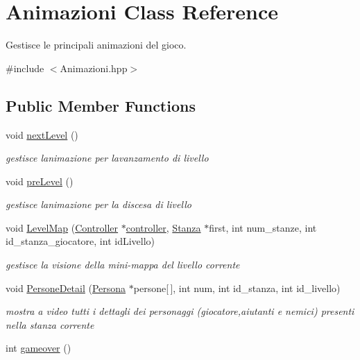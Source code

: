 \hypertarget{classAnimazioni}{}\section{Animazioni Class Reference}
\label{classAnimazioni}


Gestisce le principali animazioni del gioco.  




{\ttfamily \#include $<$Animazioni.\+hpp$>$}

\subsection*{Public Member Functions}
\begin{DoxyCompactItemize}
\item 
\hypertarget{classAnimazioni_a4b82cad764f55cf17fbf4c368909f102}{}void \hyperlink{classAnimazioni_a4b82cad764f55cf17fbf4c368909f102}{next\+Level} ()\label{classAnimazioni_a4b82cad764f55cf17fbf4c368909f102}

\begin{DoxyCompactList}\small\item\em gestisce l\textquotesingle{}animazione per l\textquotesingle{}avanzamento di livello \end{DoxyCompactList}\item 
\hypertarget{classAnimazioni_aaa3627d10d1a0179e47ad4483714f460}{}void \hyperlink{classAnimazioni_aaa3627d10d1a0179e47ad4483714f460}{pre\+Level} ()\label{classAnimazioni_aaa3627d10d1a0179e47ad4483714f460}

\begin{DoxyCompactList}\small\item\em gestisce l\textquotesingle{}animazione per la discesa di livello \end{DoxyCompactList}\item 
void \hyperlink{classAnimazioni_ac4595a521eb207aa908cad427f511df2}{Level\+Map} (\hyperlink{structController}{Controller} $\ast$\hyperlink{structcontroller}{controller}, \hyperlink{classStanza}{Stanza} $\ast$first, int num\+\_\+stanze, int id\+\_\+stanza\+\_\+giocatore, int id\+Livello)
\begin{DoxyCompactList}\small\item\em gestisce la visione della mini-\/mappa del livello corrente \end{DoxyCompactList}\item 
void \hyperlink{classAnimazioni_a3076b0bd1364b4b89453848a14ea2dd7}{Persone\+Detail} (\hyperlink{classPersona}{Persona} $\ast$persone\mbox{[}$\,$\mbox{]}, int num, int id\+\_\+stanza, int id\+\_\+livello)
\begin{DoxyCompactList}\small\item\em mostra a video tutti i dettagli dei personaggi (giocatore,aiutanti e nemici) presenti nella stanza corrente \end{DoxyCompactList}\item 
\hypertarget{classAnimazioni_a9ea47ec16435e406d86a3ca30df02459}{}int \hyperlink{classAnimazioni_a9ea47ec16435e406d86a3ca30df02459}{gameover} ()\label{classAnimazioni_a9ea47ec16435e406d86a3ca30df02459}


\end{DoxyCompactItemize}
